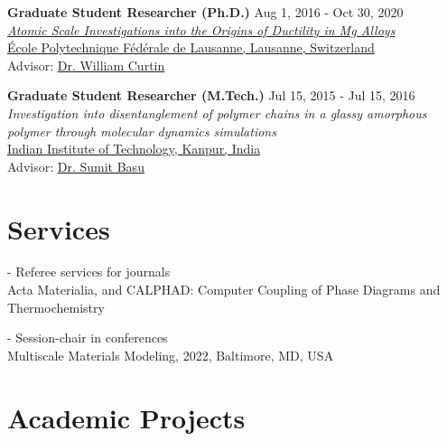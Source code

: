 \documentclass[margin,line]{resume}
\begin{document}
\begin{resume}


    \textbf{\textsf{Graduate Student Researcher (Ph.D.)}}    \hfill  \small{Aug 1, 2016 - Oct 30, 2020} \\
    \href{https://infoscience.epfl.ch/record/280981}{\textit{Atomic Scale Investigations into the Origins of Ductility in Mg Alloys}}\\
    \href{https://www.epfl.ch/en/}{\'Ecole Polytechnique F\'ed\'erale de Lausanne, Lausanne, Switzerland}\\
    Advisor:  \href{https://people.epfl.ch//william.curtin?lang=en}{Dr. William Curtin}


    \textbf{\textsf{Graduate Student Researcher (M.Tech.)}} \hfill \small{Jul 15, 2015 - Jul 15, 2016} \\
    \textit{Investigation into disentanglement of polymer chains in a glassy amorphous polymer through molecular dynamics simulations}   \\
    \href{http://www.iitk.ac.in/}{Indian Institute of Technology, Kanpur, India}\\
    Advisor: \href{http://home.iitk.ac.in/~sbasu/}{Dr. Sumit Basu}


    \section{\mysidestyle Services}
    - Referee services for journals \\
    \hspace*{0.5cm} Acta Materialia, and CALPHAD: Computer Coupling of Phase Diagrams and Thermochemistry

    - Session-chair in conferences \\
    \hspace*{0.5cm} Multiscale Materials Modeling, 2022, Baltimore, MD, USA


    \section{\mysidestyle Academic Projects}


\end{resume}
\end{document}
